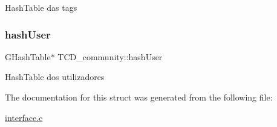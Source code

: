 Hash\+Table das tags \mbox{\label{structTCD__community_ac7d27b6b20218509393b045cb0d544d8}} 
\subsubsection{\texorpdfstring{hash\+User}{hashUser}}
{\footnotesize\ttfamily G\+Hash\+Table$\ast$ T\+C\+D\+\_\+community\+::hash\+User}

Hash\+Table dos utilizadores 

The documentation for this struct was generated from the following file\+:\begin{DoxyCompactItemize}
\item 
\hyperlink{interface_8c}{interface.\+c}\end{DoxyCompactItemize}
